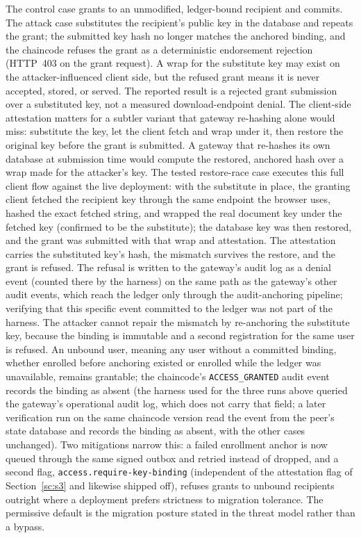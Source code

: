 \documentclass[preprint,12pt]{elsarticle}
\begin{document}
The control case grants to an unmodified, ledger-bound recipient and commits.
The attack case substitutes the recipient's public key in the database and
repeats the grant; the submitted key hash no longer matches the anchored
binding, and the chaincode refuses the grant as a deterministic endorsement
rejection (HTTP~403 on the grant request). A wrap for the substitute key may
exist on the attacker-influenced client side, but the refused grant means it
is never accepted, stored, or served. The reported result is a rejected grant
submission over a substituted key, not a measured download-endpoint denial. The client-side attestation matters for a subtler variant that
gateway re-hashing alone would miss: substitute the key, let the client fetch
and wrap under it, then restore the original key before the grant is
submitted. A gateway that re-hashes its own database at submission time would
compute the restored, anchored hash over a wrap made for the attacker's key.
The tested restore-race case executes this full client flow against the live
deployment: with the substitute in place, the granting client fetched the
recipient key through the same endpoint the browser uses, hashed the exact
fetched string, and wrapped the real document key under the fetched key
(confirmed to be the substitute); the database key was then restored, and the
grant was submitted with that wrap and attestation. The attestation carries
the substituted key's hash, the mismatch survives the restore, and the grant
is refused. The refusal is written to the gateway's audit log as a denial
event (counted there by the harness) on the same path as the gateway's other
audit events, which reach the ledger only through the audit-anchoring pipeline;
verifying that this specific event committed to the ledger was not part of the
harness. The
attacker cannot repair the mismatch by re-anchoring the substitute key,
because the binding is immutable and a second registration for the same user
is refused. An unbound user, meaning any user without a committed binding,
whether enrolled before anchoring existed or enrolled while the ledger was
unavailable, remains grantable; the chaincode's \texttt{ACCESS\_GRANTED}
audit event records the binding as absent (the harness used for the three
runs above queried the gateway's operational audit log, which does not carry
that field; a later verification run on the same chaincode version read the
event from the peer's state database and records the binding as absent,
with the other cases unchanged). Two mitigations narrow this: a failed enrollment anchor is now queued through the
same signed outbox and retried instead of dropped, and a second flag, \texttt{access.require-key-binding}
(independent of the attestation flag of Section~\ref{sc:s3} and likewise shipped off), refuses grants to unbound recipients outright where a
deployment prefers strictness to migration tolerance. The permissive default is the migration
posture stated in the threat model rather than a bypass.
\end{document}
